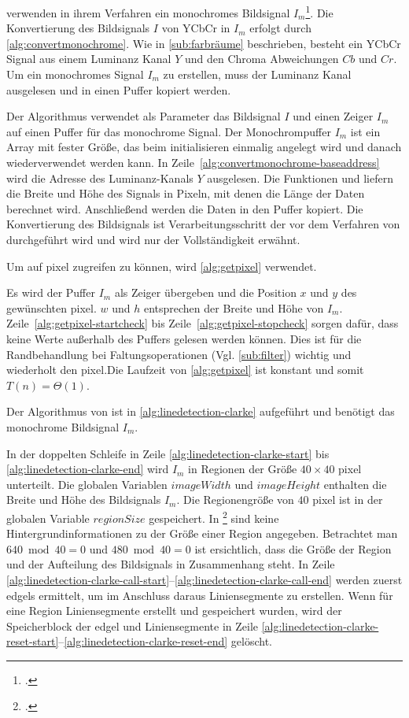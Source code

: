 \citeauthor{clarke96} verwenden in ihrem Verfahren ein monochromes Bildsignal $I_m$\footcite[Vgl.][S.~417]{clarke96}.
 Die Konvertierung des Bildsignals $I$ von YCbCr in $I_m$ erfolgt durch \autoref{alg:convertmonochrome}. Wie in
 \autoref{sub:farbräume} beschrieben, besteht ein YCbCr Signal aus einem Luminanz Kanal $Y$ und den Chroma Abweichungen
 $Cb$ und $Cr$. Um ein monochromes Signal $I_m$ zu erstellen, muss der Luminanz Kanal ausgelesen und in einen Puffer
 kopiert werden.

Der Algorithmus verwendet als Parameter das Bildsignal $I$ und einen Zeiger $I_m$ auf einen Puffer für das monochrome
 Signal. Der Monochrompuffer $I_m$ ist ein Array mit fester Größe, das beim initialisieren einmalig angelegt wird und
 danach wiederverwendet werden kann. In Zeile~\ref{alg:convertmonochrome-baseaddress} wird die Adresse des
 Luminanz-Kanals $Y$ ausgelesen. Die Funktionen  und  liefern die Breite und Höhe des
 Signals in Pixeln, mit denen die Länge der Daten berechnet wird. Anschließend werden die Daten in den Puffer kopiert.
 Die Konvertierung des Bildsignals ist Verarbeitungsschritt der vor dem Verfahren von \citeauthor{clarke96} durchgeführt
 wird und wird nur der Vollständigkeit erwähnt.

Um auf \gls{pixel} zugreifen zu können, wird \autoref{alg:getpixel} verwendet.

Es wird der Puffer $I_m$ als Zeiger übergeben und die Position $x$ und $y$ des gewünschten \gls{pixel}. $w$ und $h$
 entsprechen der Breite und Höhe von $I_m$. Zeile~\ref{alg:getpixel-startcheck} bis Zeile~\ref{alg:getpixel-stopcheck}
 sorgen dafür, dass keine Werte außerhalb des Puffers gelesen werden können. Dies ist für die Randbehandlung bei
 Faltungsoperationen (Vgl. \autoref{sub:filter}) wichtig und wiederholt den \gls{pixel}.Die Laufzeit von
 \autoref{alg:getpixel} ist konstant und somit $T(n)=\Theta(1)$.

Der Algorithmus von \citeauthor{clarke96} ist in \autoref{alg:linedetection-clarke} aufgeführt und benötigt das
 monochrome Bildsignal $I_m$.

In der doppelten Schleife in Zeile \ref{alg:linedetection-clarke-start} bis \ref{alg:linedetection-clarke-end} wird
 $I_m$ in Regionen der Größe $40 \times 40$ \gls{pixel} unterteilt. Die globalen Variablen $\mathit{imageWidth}$ und
 $\mathit{imageHeight}$ enthalten die Breite und Höhe des Bildsignals $I_m$. Die Regionengröße von $40$ \gls{pixel} ist
 in der globalen Variable $\mathit{regionSize}$ gespeichert. In \citeauthor{clarke96}\footcite{clarke96} sind keine
 Hintergrundinformationen zu der Größe einer Region angegeben. Betrachtet man $640 \bmod 40 = 0$ und $480 \bmod 40 = 0$
 ist ersichtlich, dass die Größe der Region und der Aufteilung des Bildsignals in Zusammenhang steht. In Zeile
 \ref{alg:linedetection-clarke-call-start}--\ref{alg:linedetection-clarke-call-end} werden zuerst \glspl{edgel}
 ermittelt, um im Anschluss daraus Liniensegmente zu erstellen. Wenn für eine Region Liniensegmente erstellt und
 gespeichert wurden, wird der Speicherblock der \gls{edgel} und Liniensegmente in Zeile
 \ref{alg:linedetection-clarke-reset-start}--\ref{alg:linedetection-clarke-reset-end} gelöscht.

